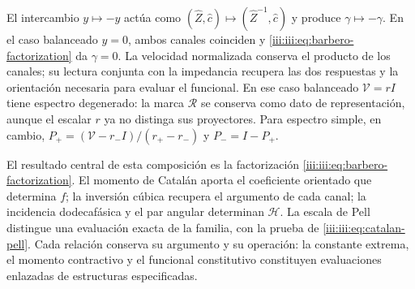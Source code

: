 El intercambio $y\mapsto-y$ actúa como
$(\widehat Z,\widehat c)\mapsto(\widehat Z^{-1},\widehat c)$ y
produce $\gamma\mapsto-\gamma$. En el caso balanceado $y=0$,
ambos canales coinciden y \eqref{iii:iii:eq:barbero-factorization} da
$\gamma=0$. La velocidad normalizada conserva el producto de los
canales; su lectura conjunta con la impedancia recupera las dos
respuestas y la orientación necesaria para evaluar el funcional.
En ese caso balanceado $\mathcal V=rI$ tiene espectro degenerado:
la marca $\mathcal R$ se conserva como dato de representación, aunque
el escalar $r$ ya no distinga sus proyectores. Para espectro simple,
en cambio,
$P_+=(\mathcal V-r_-I)/(r_+-r_-)$ y $P_-=I-P_+$.

El resultado central de esta composición es la factorización
\eqref{iii:iii:eq:barbero-factorization}. El momento de Catalán aporta el
coeficiente orientado que determina $f$; la inversión cúbica recupera
el argumento de cada canal; la incidencia dodecafásica y el par angular
determinan $\mathcal H$. La escala de Pell distingue una evaluación
exacta de la familia, con la prueba de
\eqref{iii:iii:eq:catalan-pell}. Cada relación conserva su argumento y su
operación: la constante extrema, el momento contractivo y el funcional
constitutivo constituyen evaluaciones enlazadas de estructuras
especificadas.
